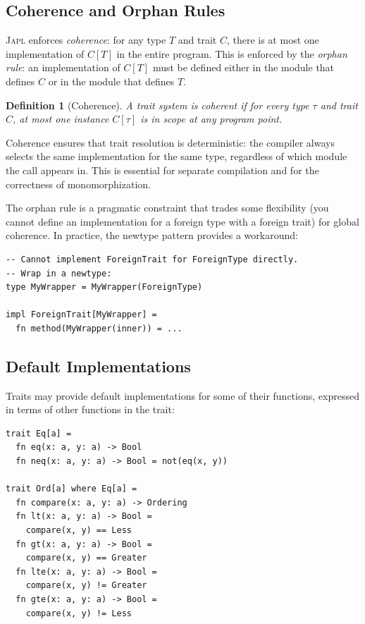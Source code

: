 \documentclass[11pt,a4paper]{article}
\newtheorem{definition}[theorem]{Definition}
\newcommand{\japl}{\textsc{Japl}}
\begin{document}
\subsection{Coherence and Orphan Rules}

\japl{} enforces \emph{coherence}: for any type $T$ and trait $C$, there is at most one implementation of $C[T]$ in the entire program. This is enforced by the \emph{orphan rule}: an implementation of $C[T]$ must be defined either in the module that defines $C$ or in the module that defines $T$.

\begin{definition}[Coherence]
A trait system is \emph{coherent} if for every type $\tau$ and trait $C$, at most one instance $C[\tau]$ is in scope at any program point.
\end{definition}

Coherence ensures that trait resolution is deterministic: the compiler always selects the same implementation for the same type, regardless of which module the call appears in. This is essential for separate compilation and for the correctness of monomorphization.

The orphan rule is a pragmatic constraint that trades some flexibility (you cannot define an implementation for a foreign type with a foreign trait) for global coherence. In practice, the newtype pattern provides a workaround:

\begin{lstlisting}
-- Cannot implement ForeignTrait for ForeignType directly.
-- Wrap in a newtype:
type MyWrapper = MyWrapper(ForeignType)

impl ForeignTrait[MyWrapper] =
  fn method(MyWrapper(inner)) = ...
\end{lstlisting}

\subsection{Default Implementations}

Traits may provide default implementations for some of their functions, expressed in terms of other functions in the trait:

\begin{lstlisting}
trait Eq[a] =
  fn eq(x: a, y: a) -> Bool
  fn neq(x: a, y: a) -> Bool = not(eq(x, y))

trait Ord[a] where Eq[a] =
  fn compare(x: a, y: a) -> Ordering
  fn lt(x: a, y: a) -> Bool =
    compare(x, y) == Less
  fn gt(x: a, y: a) -> Bool =
    compare(x, y) == Greater
  fn lte(x: a, y: a) -> Bool =
    compare(x, y) != Greater
  fn gte(x: a, y: a) -> Bool =
    compare(x, y) != Less
\end{lstlisting}
\end{document}

